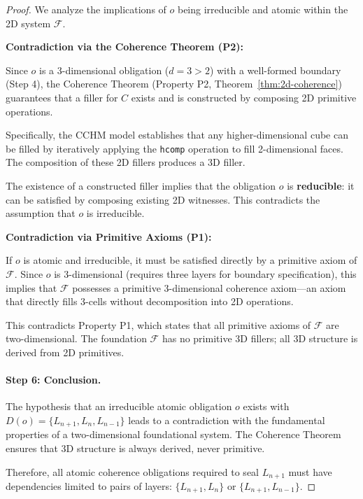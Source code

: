 \documentclass[11pt]{article}
\theoremstyle{definition}
\theoremstyle{remark}
\begin{document}
\begin{proof}
We analyze the implications of $o$ being irreducible and atomic within the 2D system $\mathcal{F}$.

\textbf{Contradiction via the Coherence Theorem (P2):}

Since $o$ is a 3-dimensional obligation ($d=3>2$) with a well-formed boundary (Step 4), the Coherence
Theorem (Property P2, Theorem~\ref{thm:2d-coherence}) guarantees that a filler for $C$ exists and
is constructed by composing 2D primitive operations.

Specifically, the CCHM model establishes that any higher-dimensional cube can be filled by iteratively
applying the \texttt{hcomp} operation to fill 2-dimensional faces. The composition of these 2D fillers
produces a 3D filler.

The existence of a constructed filler implies that the obligation $o$ is \textbf{reducible}: it can be
satisfied by composing existing 2D witnesses. This contradicts the assumption that $o$ is irreducible.

\textbf{Contradiction via Primitive Axioms (P1):}

If $o$ is atomic and irreducible, it must be satisfied directly by a primitive axiom of $\mathcal{F}$. Since
$o$ is 3-dimensional (requires three layers for boundary specification), this implies that $\mathcal{F}$ possesses
a primitive 3-dimensional coherence axiom---an axiom that directly fills 3-cells without decomposition
into 2D operations.

This contradicts Property P1, which states that all primitive axioms of $\mathcal{F}$ are two-dimensional.
The foundation $\mathcal{F}$ has no primitive 3D fillers; all 3D structure is derived from 2D primitives.

\paragraph{Step 6: Conclusion.}

The hypothesis that an irreducible atomic obligation $o$ exists with $D(o) = \{L_{n+1}, L_n, L_{n-1}\}$
leads to a contradiction with the fundamental properties of a two-dimensional foundational system.
The Coherence Theorem ensures that 3D structure is always derived, never primitive.

Therefore, all atomic coherence obligations required to seal $L_{n+1}$ must have dependencies limited
to pairs of layers: $\{L_{n+1}, L_n\}$ or $\{L_{n+1}, L_{n-1}\}$.
\end{proof}
\end{document}
